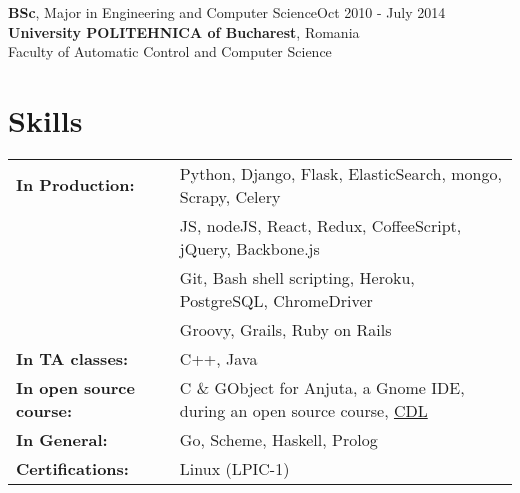\documentclass[line, margin]{resume}
\begin{document}
\begin{resume}
    \textbf{BSc}, Major in Engineering and Computer Science\hfill Oct 2010 - July 2014\\
    \textbf{University POLITEHNICA of Bucharest}, Romania\\
    Faculty of Automatic Control and Computer Science
\section{Skills}

\begin{tabular}[t]{@{} p{1.7in} p{3.8in} @{}}
\bf{In Production:} & Python, Django, Flask, ElasticSearch, mongo, Scrapy, Celery\\
    				& JS, nodeJS, React, Redux, CoffeeScript, jQuery, Backbone.js\\
                    & Git, Bash shell scripting, Heroku, PostgreSQL, ChromeDriver\\
                    & Groovy, Grails, Ruby on Rails\\
\bf{In TA classes:} & C++, Java\\
\bf{In open source course:} & C \& GObject for Anjuta, a Gnome IDE, during an open source course, \href{http://cdl.rosedu.org/}{CDL}\\
\bf{In General:} & Go, Scheme, Haskell, Prolog\\
\bf{Certifications:} & Linux (LPIC-1)
\end{tabular}

\end{resume}
\end{document}
